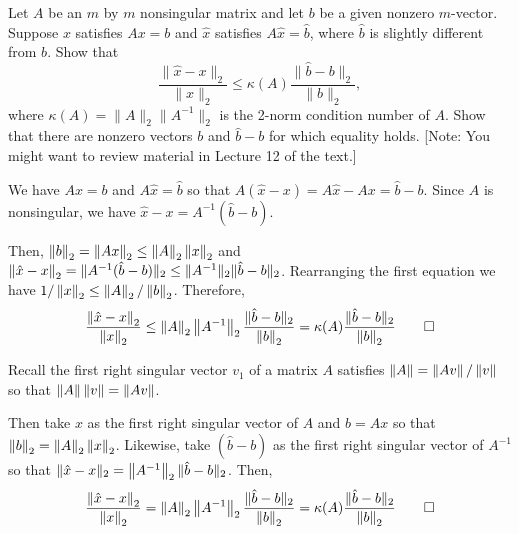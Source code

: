 \documentclass[10pt]{article}
\begin{document}
\maketitle

\begin{problem}[Exercise 1]
Let \(A\) be an \(m\) by \(m\) nonsingular matrix and let \(b\) be a given nonzero \(m\)-vector.  Suppose \(x\) satisfies \(Ax = b\) and \(\hat{x}\) satisfies \(A \hat{x} = \hat{b}\), where \(\hat{b}\) is slightly different from \(b\).  Show that
\[ \frac{\| \hat{x} - x \|_2}{\| x \|_2} \leq \kappa (A) \frac{\| \hat{b} - b \|_2}
{\| b \|_2} ,\]
where \(\kappa (A) = \| A \|_2 \| A^{-1} \|_2\) is the 2-norm condition number of \(A\).  Show that there are nonzero vectors \(b\) and \(\hat{b} - b\) for which equality holds.  [Note:  You might want to review material in Lecture 12 of the text.]
\end{problem}

\begin{solution}[Solution]
We have \( Ax=b \) and \( A\hat{x} = \hat{b} \) so that \( A(\hat{x}-x) = A\hat{x} -Ax = \hat{b}-b \). Since \( A \) is nonsingular, we have \( \hat{x}-x = A^{-1}(\hat{b}-b) \).

Then, \( \left\lVert b\right\rVert_2 = \left\lVert Ax\right\rVert_2 \leq \left\lVert A\right\rVert_2\left\lVert x\right\rVert_2 \) and \( \left\lVert\hat{x}-x\right\rVert_2 = \lVert A^{-1}(\hat{b}-b)\rVert_2 \leq \lVert A^{-1}\rVert_2\lVert\hat{b}-b\rVert_2 \). Rearranging the first equation we have \( 1/\left\lVert x\right\rVert_2 \leq \left\lVert A\right\rVert_2/\left\lVert b\right\rVert_2 \).
Therefore,
\begin{align*}
    \dfrac{\norm{\hat{x}-x}_2}{\norm{x}_2} \leq \norm{A}_2\norm{A^{-1}}_2\dfrac{\snorm{\hat{b}-b}_2}{\norm{b}_2} = \kappa(A) \dfrac{\snorm{\hat{b}-b}_2}{\norm{b}_2} \tag*{\qed}
\end{align*}

Recall the first right singular vector \( v_1 \) of a matrix \( A \) satisfies \( \left\lVert A\right\rVert = \left\lVert Av\right\rVert/\left\lVert v\right\rVert \) so that \( \left\lVert A\right\rVert\left\lVert v\right\rVert = \left\lVert Av\right\rVert \).

Then take \( x \) as the first right singular vector of \( A \) and \( b=Ax \) so that \( \left\lVert b\right\rVert_2 = \left\lVert A\right\rVert_2\left\lVert x\right\rVert_2 \). Likewise, take \( (\hat{b}-b) \) as the first right singular vector of \( A^{-1} \) so that \( \lVert\hat{x}-x\rVert_2 = \left\lVert A^{-1}\right\rVert_2\lVert\hat{b}-b\rVert_2 \). Then,
\begin{align*}
    \dfrac{\norm{\hat{x}-x}_2}{\norm{x}_2} = \norm{A}_2\norm{A^{-1}}_2\dfrac{\snorm{\hat{b}-b}_2}{\norm{b}_2} = \kappa(A) \dfrac{\snorm{\hat{b}-b}_2}{\norm{b}_2} \tag*{\qed} 
\end{align*} 
\end{solution}
\end{document}
